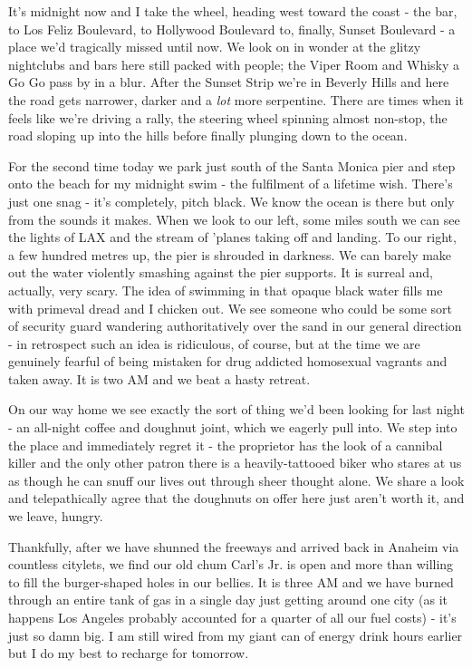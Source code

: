 \documentclass[a5paper,titlepage,11pt,draft]{book}
\begin{document}
It's midnight now and I take the wheel, heading west toward the coast - the bar, to Los Feliz Boulevard, to Hollywood Boulevard to, finally, Sunset Boulevard - a place we'd tragically missed until now.  We look on in wonder at the glitzy nightclubs and bars here still packed with people; the Viper Room and Whisky a Go Go pass by in a blur.  After the Sunset Strip we're in Beverly Hills and here the road gets narrower, darker and a \emph{lot} more serpentine.  There are times when it feels like we're driving a rally, the steering wheel spinning almost non-stop, the road sloping up into the hills before finally plunging down to the ocean.

For the second time today we park just south of the Santa Monica pier and step onto the beach for my midnight swim - the fulfilment of a lifetime wish.  There's just one snag - it's completely, pitch black.  We know the ocean is there but only from the sounds it makes.  When we look to our left, some miles south we can see the lights of LAX and the stream of 'planes taking off and landing.  To our right, a few hundred metres up, the pier is shrouded in darkness.  We can barely make out the water violently smashing against the pier supports.  It is surreal and, actually, very scary.  The idea of swimming in that opaque black water fills me with primeval dread and I chicken out.  We see someone who could be some sort of security guard wandering authoritatively over the sand in our general direction - in retrospect such an idea is ridiculous, of course, but at the time we are genuinely fearful of being mistaken for drug addicted homosexual vagrants and taken away.  It is two AM and we beat a hasty retreat.

On our way home we see exactly the sort of thing we'd been looking for last night - an all-night coffee and doughnut joint, which we eagerly pull into.  We step into the place and immediately regret it - the proprietor has the look of a cannibal killer and the only other patron there is a heavily-tattooed biker who stares at us as though he can snuff our lives out through sheer thought alone.  We share a look and telepathically agree that the doughnuts on offer here just aren't worth it, and we leave, hungry.

Thankfully, after we have shunned the freeways and arrived back in Anaheim via countless citylets, we find our old chum Carl's Jr. is open and more than willing to fill the burger-shaped holes in our bellies.  It is three AM and we have burned through an entire tank of gas in a single day just getting around one city (as it happens Los Angeles probably accounted for a quarter of all our fuel costs) - it's just so damn big.  I am still wired from my giant can of energy drink hours earlier but I do my best to recharge for tomorrow.
\end{document}
